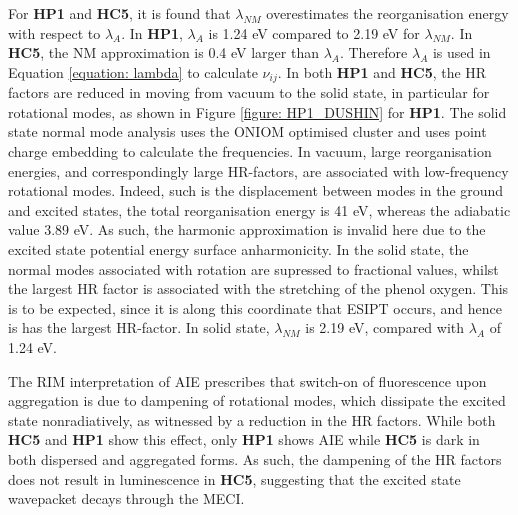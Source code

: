 For \textbf{HP1} and \textbf{HC5}, it is found that $\lambda_{NM}$ overestimates the reorganisation energy with respect to $\lambda_{A}$. In \textbf{HP1},  $\lambda_{A}$ is 1.24 eV compared to 2.19 eV for $\lambda_{NM}$. In \textbf{HC5}, the NM approximation is 0.4 eV larger than $\lambda_{A}$. Therefore $\lambda_{A}$ is used in Equation \ref{equation: lambda} to calculate $\nu_{ij}$. In both \textbf{HP1} and \textbf{HC5}, the HR factors are reduced in moving from vacuum to the solid state, in particular for rotational modes, as shown in Figure \ref{figure: HP1_DUSHIN} for \textbf{HP1}. The solid state normal mode analysis uses the ONIOM optimised cluster and uses point charge embedding to calculate the frequencies. In vacuum, large reorganisation energies, and correspondingly large HR-factors, are associated with low-frequency rotational modes. Indeed, such is the displacement between modes in the ground and excited states, the total reorganisation energy is 41 eV, whereas the adiabatic value 3.89 eV. As such, the harmonic approximation is invalid here due to the excited state potential energy surface anharmonicity. In the solid state, the normal modes associated with rotation are supressed to fractional values, whilst the largest HR factor is associated with the stretching of the phenol oxygen. This is to be expected, since it is along this coordinate that ESIPT occurs, and hence is has the largest HR-factor. In solid state, $\lambda_{NM}$ is 2.19 eV, compared with $\lambda_{A}$ of 1.24 eV. 

The RIM interpretation of AIE prescribes that switch-on of fluorescence upon aggregation is due to dampening of rotational modes, which dissipate the excited state nonradiatively, as witnessed by a reduction in the HR factors. While both \textbf{HC5} and \textbf{HP1} show this effect, only \textbf{HP1} shows AIE while \textbf{HC5} is dark in both dispersed and aggregated forms. As such, the dampening of the HR factors does not result in luminescence in \textbf{HC5}, suggesting that the excited state wavepacket decays through the MECI. 

